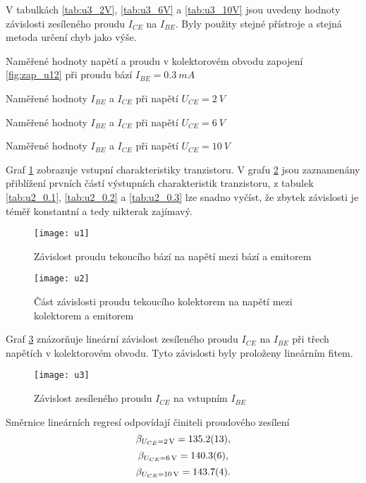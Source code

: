 \documentclass[0-protokol.tex]{subfiles}
\begin{document}
V tabulkách \ref{tab:u3_2V}, \ref{tab:u3_6V} a \ref{tab:u3_10V} jsou uvedeny hodnoty závislosti zesíleného proudu $I_{CE}$ na $I_{BE}$. Byly použity stejné přístroje a stejná metoda určení chyb jako výše.
\begin{multicols}{2}

\begin{table}[H] 
\centering
\setlength{\tabcolsep}{10pt}

\caption{Naměřené hodnoty napětí a proudu v kolektorovém obvodu zapojení \ref{fig:zap_u12} při proudu bází $I_{BE} = \SI{0.3}{mA}$}
\label{tab:u2_0.3}
\end{table}

\begin{table}[H] 
\raggedleft
\setlength{\tabcolsep}{10pt}

\caption{Naměřené hodnoty $I_{BE}$ a $I_{CE}$ při napětí $U_{CE} = \SI{2}{V}$}
\label{tab:u3_2V}
\end{table}

\begin{table}[H] 
\raggedleft
\setlength{\tabcolsep}{10pt}

\caption{Naměřené hodnoty $I_{BE}$ a $I_{CE}$ při napětí $U_{CE} = \SI{6}{V}$}
\label{tab:u3_6V}
\end{table}

\begin{table}[H] 
\raggedleft
\setlength{\tabcolsep}{10pt}

\caption{Naměřené hodnoty $I_{BE}$ a $I_{CE}$ při napětí $U_{CE} = \SI{10}{V}$}
\label{tab:u3_10V}
\end{table}

\end{multicols}

Graf \ref{fig:u1} zobrazuje vstupní charakteristiky tranzistoru. V grafu \ref{fig:u2} jsou zaznamenány přiblížení prvních částí výstupních charakteristik tranzistoru, z tabulek \ref{tab:u2_0.1}, \ref{tab:u2_0.2} a \ref{tab:u2_0.3} lze snadno vyčíst, že zbytek závislosti je téměř konstantní a tedy nikterak zajímavý.

\begin{figure}[H]
\centering
\texttt{[image: u1]}
\caption{Závislost proudu tekoucího bází na napětí mezi bází a emitorem}
\label{fig:u1}
\end{figure}

\begin{figure}[H]
\centering
\texttt{[image: u2]}
\caption{Část závislosti proudu tekoucího kolektorem na napětí mezi kolektorem a emitorem}
\label{fig:u2}
\end{figure}

Graf \ref{fig:u3} znázorňuje lineární závislost zesíleného proudu $I_{CE}$ na $I_{BE}$ při třech napětích v kolektorovém obvodu. Tyto závislosti byly proloženy lineárním fitem.

\begin{figure}[H]
\centering
\texttt{[image: u3]}
\caption{Závislost zesíleného proudu $I_{CE}$ na vstupním $I_{BE}$}
\label{fig:u3}
\end{figure}

Směrnice lineárních regresí odpovídají činiteli proudového zesílení 
$$ \beta_{U_{CE} = \SI{2}{V}} = \SI{135.2 \pm 1.3}{}, $$
$$ \beta_{U_{CE} = \SI{6}{V}} = \SI{140.3 \pm 0.6}{}, $$
$$ \beta_{U_{CE} = \SI{10}{V}} = \SI{143.7 \pm 0.4}{}. $$
\end{document}
